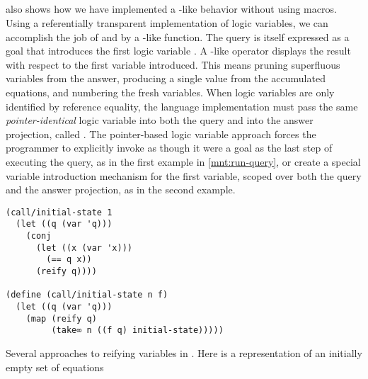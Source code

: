 \documentclass[sigplan,balance=true,pbalance=true,natbib=false]{acmart}
\begin{document}
\subsection{}

 also shows how we have
implemented a -like behavior without using macros.
Using a referentially transparent implementation of logic variables,
we can accomplish the job of  and  by
a -like function. The query is itself
expressed as a goal that introduces the first logic variable
. A -like operator displays the result
with respect to the first variable introduced. This means pruning
superfluous variables from the answer, producing a single value from
the accumulated equations, and numbering the fresh variables. When
logic variables are only identified by reference equality, the
language implementation must pass the same \emph{pointer-identical}
logic variable into both the query and into the answer projection,
called . The pointer-based logic variable approach
forces the programmer to explicitly invoke  as
though it were a goal as the last step of executing the query, as in
the first example in \cref{mnt:run-query}, or create a special
variable introduction mechanism for the first variable, scoped over
both the query and the answer projection, as in the second example.

\begin{listing}[h]
  \begin{verbatim}
(call/initial-state 1
  (let ((q (var 'q)))
    (conj
      (let ((x (var 'x)))
        (== q x))
      (reify q))))

(define (call/initial-state n f)
  (let ((q (var 'q)))
    (map (reify q)
         (take∞ n ((f q) initial-state)))))
  \end{verbatim}
  \caption{Several approaches to reifying variables in . Here  is a representation of an initially empty set of equations}\label{mnt:run-query}
\end{listing}



\subsection{}
\end{document}
